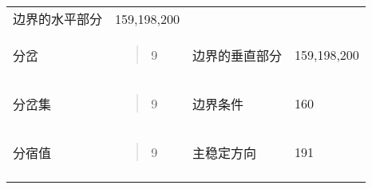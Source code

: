 \begin{longtable}[]{@{}llll@{}}
\begin{minipage}[t]{0.22\columnwidth}
边界的水平部分\strut
\end{minipage} & \begin{minipage}[t]{0.22\columnwidth}\raggedright
159,198,200\strut
\end{minipage}\tabularnewline
\begin{minipage}[t]{0.22\columnwidth}\raggedright
分岔\strut
\end{minipage} & \begin{minipage}[t]{0.22\columnwidth}\raggedright
\begin{quote}
9
\end{quote}\strut
\end{minipage} & \begin{minipage}[t]{0.22\columnwidth}\raggedright
边界的垂直部分\strut
\end{minipage} & \begin{minipage}[t]{0.22\columnwidth}\raggedright
159,198,200\strut
\end{minipage}\tabularnewline
\begin{minipage}[t]{0.22\columnwidth}\raggedright
分岔集\strut
\end{minipage} & \begin{minipage}[t]{0.22\columnwidth}\raggedright
\begin{quote}
9
\end{quote}\strut
\end{minipage} & \begin{minipage}[t]{0.22\columnwidth}\raggedright
边界条件\strut
\end{minipage} & \begin{minipage}[t]{0.22\columnwidth}\raggedright
160\strut
\end{minipage}\tabularnewline
\begin{minipage}[t]{0.22\columnwidth}\raggedright
分宿值\strut
\end{minipage} & \begin{minipage}[t]{0.22\columnwidth}\raggedright
\begin{quote}
9
\end{quote}\strut
\end{minipage} & \begin{minipage}[t]{0.22\columnwidth}\raggedright
主稳定方向\strut
\end{minipage} & \begin{minipage}[t]{0.22\columnwidth}\raggedright
191\strut
\end{minipage}\tabularnewline
\begin{minipage}[t]{0.22\columnwidth}\raggedright

\end{minipage}
\end{longtable}
